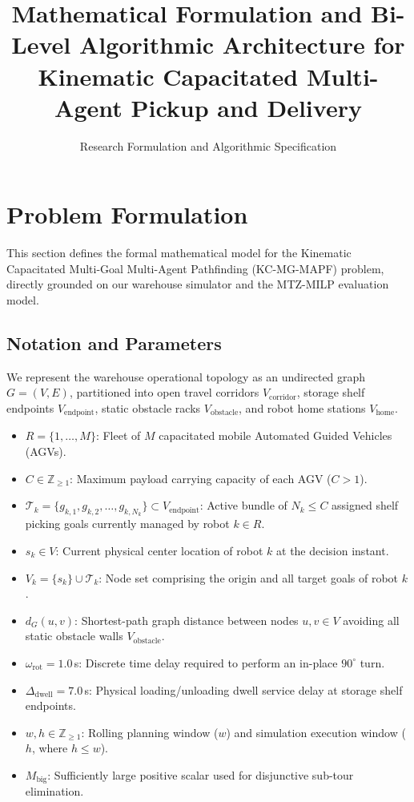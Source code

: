 \documentclass[journal]{IEEEtran}
\begin{document}
\title{Mathematical Formulation and Bi-Level Algorithmic Architecture for Kinematic Capacitated Multi-Agent Pickup and Delivery}
\author{Research Formulation and Algorithmic Specification}
\maketitle

\section{Problem Formulation}
\label{sec:problem_formulation}

This section defines the formal mathematical model for the Kinematic Capacitated Multi-Goal Multi-Agent Pathfinding (KC-MG-MAPF) problem, directly grounded on our warehouse simulator and the MTZ-MILP evaluation model.

\subsection{Notation and Parameters}
We represent the warehouse operational topology as an undirected graph $G = (V, E)$, partitioned into open travel corridors $V_{\text{corridor}}$, storage shelf endpoints $V_{\text{endpoint}}$, static obstacle racks $V_{\text{obstacle}}$, and robot home stations $V_{\text{home}}$.

\begin{itemize}
    \item $R = \{1, \dots, M\}$: Fleet of $M$ capacitated mobile Automated Guided Vehicles (AGVs).
    \item $C \in \mathbb{Z}_{\ge 1}$: Maximum payload carrying capacity of each AGV ($C > 1$).
    \item $\mathcal{T}_k = \{g_{k, 1}, g_{k, 2}, \dots, g_{k, N_k}\} \subset V_{\text{endpoint}}$: Active bundle of $N_k \le C$ assigned shelf picking goals currently managed by robot $k \in R$.
    \item $s_k \in V$: Current physical center location of robot $k$ at the decision instant.
    \item $V_k = \{s_k\} \cup \mathcal{T}_k$: Node set comprising the origin and all target goals of robot $k$.
    \item $d_G(u, v)$: Shortest-path graph distance between nodes $u, v \in V$ avoiding all static obstacle walls $V_{\text{obstacle}}$.
    \item $\omega_{\text{rot}} = 1.0$\,s: Discrete time delay required to perform an in-place $90^\circ$ turn.
    \item $\Delta_{\text{dwell}} = 7.0$\,s: Physical loading/unloading dwell service delay at storage shelf endpoints.
    \item $w, h \in \mathbb{Z}_{\ge 1}$: Rolling planning window ($w$) and simulation execution window ($h$, where $h \le w$).
    \item $M_{\text{big}}$: Sufficiently large positive scalar used for disjunctive sub-tour elimination.
\end{itemize}
\end{document}
